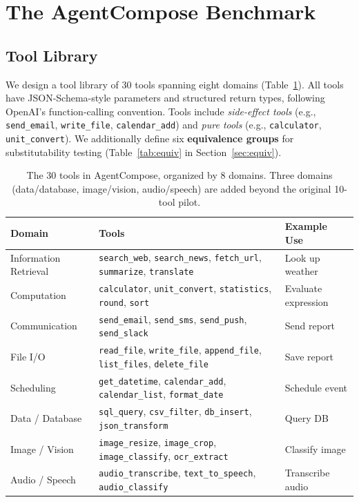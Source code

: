 \documentclass[10pt]{article}
\begin{document}
\section{The AgentCompose Benchmark}
\label{sec:benchmark}

\subsection{Tool Library}

We design a tool library of 30 tools spanning eight domains (Table~\ref{tab:tools}). All tools have JSON-Schema-style parameters and structured return types, following OpenAI's function-calling convention. Tools include \emph{side-effect tools} (e.g., \texttt{send\_email}, \texttt{write\_file}, \texttt{calendar\_add}) and \emph{pure tools} (e.g., \texttt{calculator}, \texttt{unit\_convert}). We additionally define six {\bf equivalence groups} for substitutability testing (Table~\ref{tab:equiv} in Section~\ref{sec:equiv}).

\begin{table}[t]
    \centering
    \footnotesize
    \begin{tabular}{p{1.6in}p{2.4in}p{1.0in}}
        \toprule
        Domain & Tools & Example Use \\
        \midrule
        Information Retrieval & \texttt{search\_web}, \texttt{search\_news}, \texttt{fetch\_url}, \texttt{summarize}, \texttt{translate} & Look up weather \\
        Computation & \texttt{calculator}, \texttt{unit\_convert}, \texttt{statistics}, \texttt{round}, \texttt{sort} & Evaluate expression \\
        Communication & \texttt{send\_email}, \texttt{send\_sms}, \texttt{send\_push}, \texttt{send\_slack} & Send report \\
        File I/O & \texttt{read\_file}, \texttt{write\_file}, \texttt{append\_file}, \texttt{list\_files}, \texttt{delete\_file} & Save report \\
        Scheduling & \texttt{get\_datetime}, \texttt{calendar\_add}, \texttt{calendar\_list}, \texttt{format\_date} & Schedule event \\
        Data / Database & \texttt{sql\_query}, \texttt{csv\_filter}, \texttt{db\_insert}, \texttt{json\_transform} & Query DB \\
        Image / Vision & \texttt{image\_resize}, \texttt{image\_crop}, \texttt{image\_classify}, \texttt{ocr\_extract} & Classify image \\
        Audio / Speech & \texttt{audio\_transcribe}, \texttt{text\_to\_speech}, \texttt{audio\_classify} & Transcribe audio \\
        \bottomrule
    \end{tabular}
    \caption{The 30 tools in AgentCompose, organized by 8 domains. Three domains (data/database, image/vision, audio/speech) are added beyond the original 10-tool pilot.}
    \label{tab:tools}
\end{table}
\end{document}
